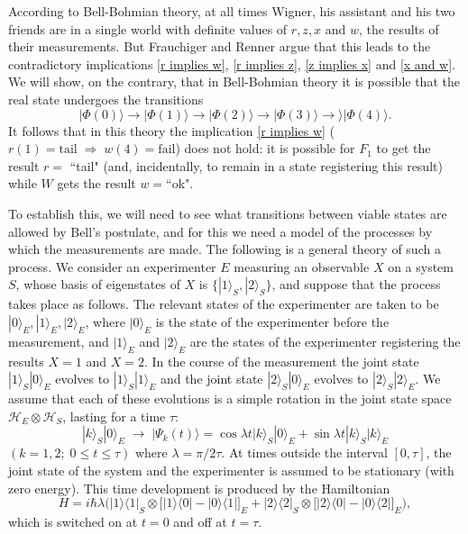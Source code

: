 \documentclass[12pt,a4paper,reqno]{article}
\newcommand{\tail}{\text{tail}}
\newcommand{\fail}{\text{fail}}
\renewcommand{\(}{\left(}
\renewcommand{\)}{\right)}
\renewcommand{\.}{\centerdot}
\newcommand{\1}{\mathbf{1}}
\renewcommand{\H}{\mathcal{H}}
\newcommand{\ox}{\otimes}
\newcommand{\<}{\langle}
\renewcommand{\>}{\rangle}
\theoremstyle{definition}
\theoremstyle{remark}
\numberwithin{equation}{section}
\begin{document}
According to Bell-Bohmian theory, at all times Wigner, his assistant and his two friends are in a single world with definite values of $r, z, x$ and $w$, the results of their measurements. But Frauchiger and Renner argue that this leads to the contradictory implications \eqref{r implies w}, \eqref{r implies z}, \eqref{z implies x} and \eqref{x and w}. We will show, on the contrary, that in Bell-Bohmian theory it is possible that the real state undergoes the transitions
\[
|\Phi(0)\> \longrightarrow |\Phi(1)\> \longrightarrow |\Phi(2)\> \longrightarrow |\Phi(3)\> \longrightarrow\> |\Phi(4)\>.
\]
It follows that in this theory the implication \eqref{r implies w} ($r(1) = \tail\; \Longrightarrow \; w(4) = \fail$) does not hold: it is possible for $F_1$ to get the result $r = $ ``tail" (and, incidentally, to remain in a state registering this result) while $W$ gets the result $w = $``ok".
 
To establish this, we will need to see what transitions between viable states are allowed by Bell's postulate, and for this we need a model of the processes by which the measurements are made. The following is a general theory of such a process. We consider an experimenter $E$ measuring an observable $X$ on a system $S$, whose basis of eigenstates of $X$ is $\{|1\>_S,|2\>_S\}$, and suppose that the process takes place as follows. The relevant states of the experimenter are taken to be $|0\>_E,|1\>_E,|2\>_E$, where $|0\>_E$ is the state of the experimenter before the measurement, and $|1\>_E$ and $|2\>_E$ are the states of the experimenter registering the results $X = 1$ and $X = 2$. In the course of the measurement the joint state $|1\>_S|0\>_E$ evolves to $|1\>_S|1\>_E$ and the joint state $|2\>_S|0\>_E$ evolves to $|2\>_S|2\>_E$. We assume that each of these evolutions is a simple rotation in the joint state space $\H_E\ox\H_S$, lasting for a time $\tau$:
\[
|k\>_S|0\>_E \; \longrightarrow \; |\Psi_k(t)\> = \cos\lambda t|k\>_S|0\>_E + \sin\lambda t|k\>_S|k\>_E
\]
$(k = 1,2; \; 0\le t\le \tau)$ where $\lambda = \pi/2\tau$. At times outside the interval $[0,\tau]$, the joint state of the system and the experimenter is assumed to be stationary (with zero energy). This time development is produced by the Hamiltonian
\[
H = i\hbar\lambda\bigg(|1\>\<1|_S\ox\big[|1\>\<0| - |0\>\<1|\big]_E + 
|2\>\<2|_S\ox\big[|2\>\<0| - |0\>\<2|\big]_E\bigg),
\]
which is switched on at $t = 0$ and off at $t = \tau$.
\end{document}
